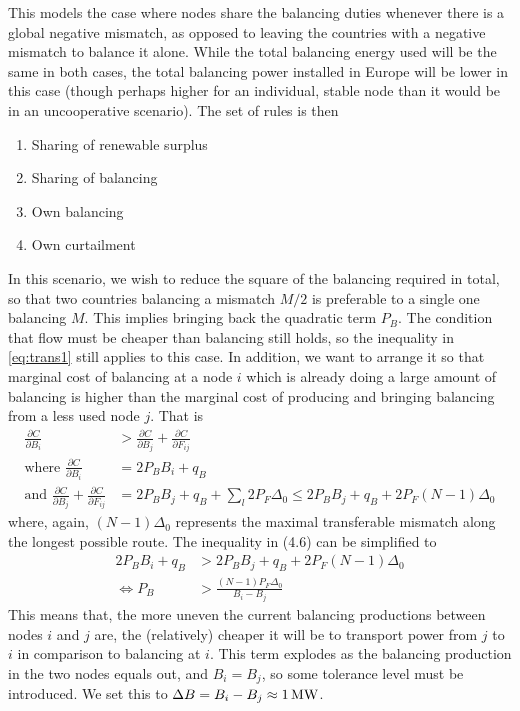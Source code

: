 \documentclass[english,twoside,a4paper,11pt]{article}
\numberwithin{equation}{section}
\begin{document}
This models the case where nodes share the balancing duties whenever
there is a global negative mismatch, as opposed to leaving the
countries with a negative mismatch to balance it alone. While the total
balancing energy used will be the same in both cases, the total
balancing power installed in Europe will be lower in this case (though
perhaps higher for an individual, stable node than it would be in an
uncooperative scenario). The set of
rules is then
\begin{enumerate}
\item Sharing of renewable surplus
\item Sharing of balancing
\item Own balancing
\item Own curtailment
\end{enumerate}
In this scenario, we wish to reduce the
square of the balancing required in total, so that two countries
balancing a mismatch $M/2$ is preferable to a single one balancing
$M$. This implies bringing back the quadratic term $P_B$. The
condition that flow must be cheaper than balancing still holds, so the
inequality in \eqref{eq:trans1} still applies to this case. In
addition, we want to arrange it so that marginal cost of balancing at a
node $i$ which is already doing a large amount of balancing is higher
than the marginal cost of producing and bringing balancing from a less
used node $j$. That is
\begin{align*}
\frac{\partial C}{\partial B_i} 
&> \frac{\partial C}{\partial B_j}+\frac{\partial C}{\partial F_{ij}}\\
\text{where } \frac{\partial C}{\partial B_i}&=2P_B B_i +q_B \\
\text{and } \frac{\partial C}{\partial B_j}+\frac{\partial C}{\partial F_{ij}}
&=2P_B B_j +q_B+\sum_l  2P_F\Delta_0 \leq 2P_BB_j+q_B +2P_F(N-1)\Delta_0
\end{align*}
where, again, $(N-1)\Delta_0$ represents the maximal transferable
mismatch along the longest possible route. The inequality in (4.6) can
be simplified to
\begin{align}
\nonumber 2P_B B_i+q_B &> 2P_B B_j+q_B +2P_F( N-1)\Delta_0\\
\Leftrightarrow
P_B & > \frac{( N-1) P_F\Delta_0}{ B_i - B_j}
\label{eq:bals}
\end{align}
This means that, the more uneven the current balancing productions
between nodes $i$ and $j$ are, the (relatively) cheaper it will be to
transport power from $j$ to $i$ in comparison to balancing at
$i$. This term explodes as the balancing production in the two nodes
equals out, and $B_i=B_j$, so some tolerance level must be
introduced. We set this to $\Delta B=B_i - B_j\approx 1\rm\,MW$. 
\end{document}
